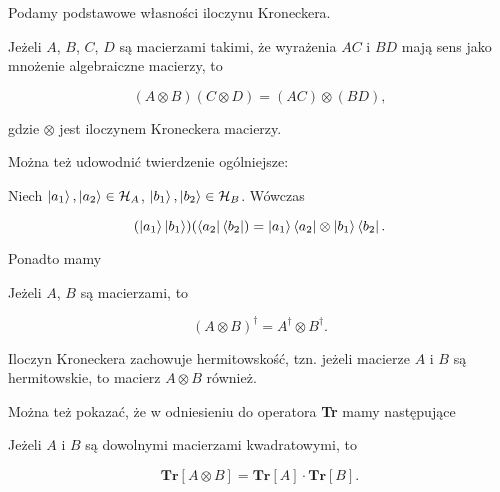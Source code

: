 Podamy podstawowe własności iloczynu Kroneckera.

\begin{theorem}
    Jeżeli $A$, $B$, $C$, $D$ są macierzami takimi, że wyrażenia $A C$ i $B D$ mają sens jako mnożenie algebraiczne macierzy, to

    \begin{equation}
        (A \otimes B) (C \otimes D) = (A C) \otimes (B D),
    \end{equation}

    gdzie $\otimes$ jest iloczynem Kroneckera macierzy.
\end{theorem}

Można też udowodnić twierdzenie ogólniejsze:

\begin{theorem}
    \label{theorem:generic}
    Niech $\ket{a_{1}}, \ket{a_{2}} \in \mathcal{H}_{A}$, $\ket{b_{1}}, \ket{b_{2}} \in \mathcal{H}_{B}$. Wówczas

    \begin{equation}
        (\ket{a_{1}} \ket{b_{1}}) (\bra{a_{2}} \bra{b_{2}}) = \ket{a_{1}} \bra{a_{2}} \otimes \ket{b_{1}} \bra{b_{2}}.
    \end{equation}
\end{theorem}

Ponadto mamy

\begin{theorem}
    Jeżeli $A$, $B$ są macierzami, to

    \begin{equation}
        (A \otimes B) ^ {\dag} = A ^ \dag \otimes B ^ \dag.
    \end{equation}
\end{theorem}

\begin{corollary}
    Iloczyn Kroneckera zachowuje hermitowskość, tzn. jeżeli macierze $A$ i $B$ są hermitowskie, to macierz $A \otimes B$ również.
\end{corollary}

Można też pokazać, że w odniesieniu do operatora \textbf{Tr} mamy następujące

\begin{theorem}
    Jeżeli $A$ i $B$ są dowolnymi macierzami kwadratowymi, to

    \begin{equation}
        \textbf{Tr}[A \otimes B] = \textbf{Tr}[A] \cdot \textbf{Tr}[B].
    \end{equation}
\end{theorem}

